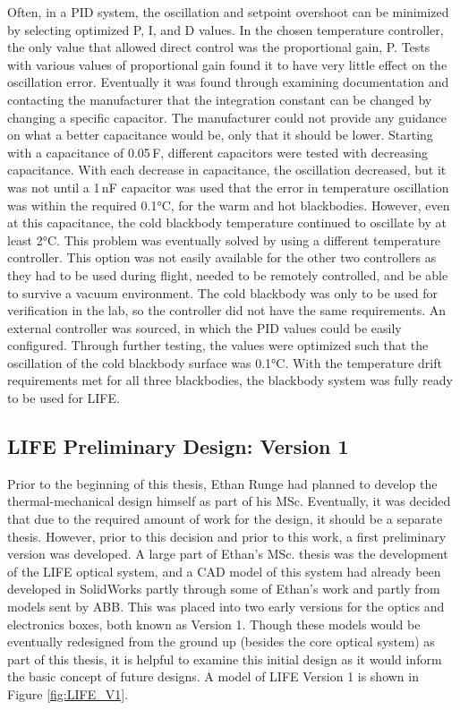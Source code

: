 Often, in a PID system, the oscillation and setpoint overshoot can be minimized by selecting optimized P, I, and D values. In the chosen temperature controller, the only value that allowed direct control was the proportional gain, P. Tests with various values of proportional gain found it to have very little effect on the oscillation error. Eventually it was found through examining documentation and contacting the manufacturer that the integration constant can be changed by changing a specific capacitor. The manufacturer could not provide any guidance on what a better capacitance would be, only that it should be lower. Starting with a capacitance of 0.05\,{\textmu}F, different capacitors were tested with decreasing capacitance. With each decrease in capacitance, the oscillation decreased, but it was not until a 1\,nF capacitor was used that the error in temperature oscillation was within the required 0.1°C, for the warm and hot blackbodies. However, even at this capacitance, the cold blackbody temperature continued to oscillate by at least 2°C. This problem was eventually solved by using a different temperature controller. This option was not easily available for the other two controllers as they had to be used during flight, needed to be remotely controlled, and be able to survive a vacuum environment. The cold blackbody was only to be used for verification in the lab, so the controller did not have the same requirements. An external controller was sourced, in which the PID values could be easily configured. Through further testing, the values were optimized such that the oscillation of the cold blackbody surface was 0.1°C. With the temperature drift requirements met for all three blackbodies, the blackbody system was fully ready to be used for LIFE.

\subsection{LIFE Preliminary Design: Version 1} 
Prior to the beginning of this thesis, Ethan Runge had planned to develop the thermal-mechanical design himself as part of his MSc. Eventually, it was decided that due to the required amount of work for the design, it should be a separate thesis. However, prior to this decision and prior to this work, a first preliminary version was developed. A large part of Ethan's MSc. thesis was the development of the LIFE optical system, and a CAD model of this system had already been developed in SolidWorks partly through some of Ethan's work and partly from models sent by ABB. This was placed into two early versions for the optics and electronics boxes, both known as Version 1. Though these models would be eventually redesigned from the ground up (besides the core optical system) as part of this thesis, it is helpful to examine this initial design as it would inform the basic concept of future designs. A model of LIFE Version 1 is shown in Figure \ref{fig:LIFE_V1}.

